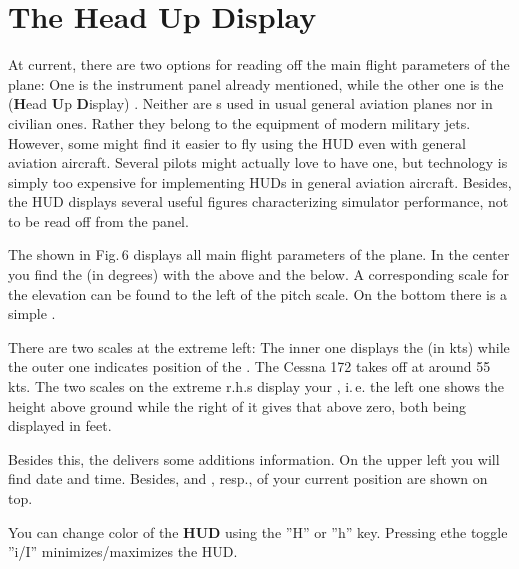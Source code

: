 \section{The Head Up Display}

At current, there are two options for reading off the main flight parameters of the
plane: One is the instrument panel already mentioned, while the other one is the
 (\textbf{H}ead \textbf{U}p \textbf{D}isplay) . Neither
are s used in usual general aviation planes nor in civilian ones. Rather they
belong to the equipment of modern military jets. However, some might find it easier to
fly using the HUD even with general aviation aircraft. Several  pilots
might actually love to have one, but technology is simply too expensive for implementing
HUDs in general aviation aircraft. Besides, the HUD displays several useful figures
characterizing simulator performance, not to be read off from the panel.

The  shown in Fig.\,6  displays all main flight parameters of the plane. In
the center you find the  (in degrees) with the  above and the  below. A corresponding scale for the
elevation can be found to the left of the pitch scale. On the
bottom there is a simple .

There are two scales at the extreme left: The inner one displays the  (in
kts) while the outer one indicates position of the . The Cessna 172 takes
off at around 55 kts. The two scales on the extreme r.h.s display your ,
i.\,e. the left one shows the height above ground while the right of it gives that above
zero, both being displayed in feet.

Besides this, the  delivers some additions information. On the upper left you
will find date and time. Besides,   and , resp., of your current position are shown on top.

You can change color of the \textbf{HUD} using the ''H'' or ''h''  key. Pressing ethe toggle ''i/I'' minimizes/maximizes the HUD.

\medskip

